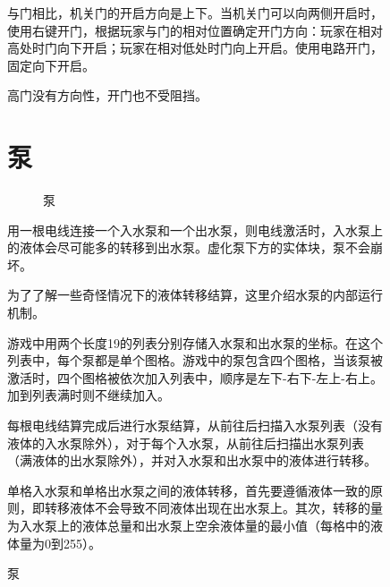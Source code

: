 \begin{figure}[!ht]
与门相比，机关门的开启方向是上下。当机关门可以向两侧开启时，使用右键开门，根据玩家与门的相对位置确定开门方向：玩家在相对高处时门向下开启；玩家在相对低处时门向上开启。使用电路开门，固定向下开启。

高门没有方向性，开门也不受阻挡。

\section{泵}
\begin{figure}[!ht]
\centering
{}\qquad
{}
\caption{泵}
\end{figure}
用一根电线连接一个入水泵和一个出水泵，则电线激活时，入水泵上的液体会尽可能多的转移到出水泵。虚化泵下方的实体块，泵不会崩坏。

为了了解一些奇怪情况下的液体转移结算，这里介绍水泵的内部运行机制。

游戏中用两个长度19的列表分别存储入水泵和出水泵的坐标。在这个列表中，每个泵都是单个图格。游戏中的泵包含四个图格，当该泵被激活时，四个图格被依次加入列表中，顺序是左下-右下-左上-右上。加到列表满时则不继续加入。

每根电线结算完成后进行水泵结算，从前往后扫描入水泵列表（没有液体的入水泵除外），对于每个入水泵，从前往后扫描出水泵列表（满液体的出水泵除外），并对入水泵和出水泵中的液体进行转移。

单格入水泵和单格出水泵之间的液体转移，首先要遵循液体一致的原则，即转移液体不会导致不同液体出现在出水泵上。其次，转移的量为入水泵上的液体总量和出水泵上空余液体量的最小值（每格中的液体量为0到255）。


\end{figure}
